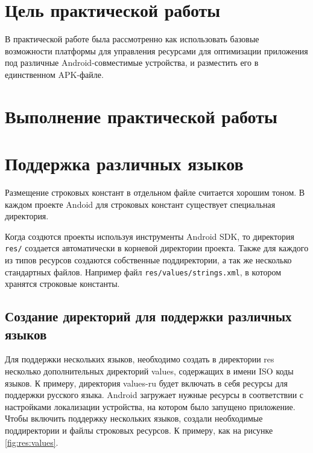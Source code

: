 \graphicspath{{./second/PNG}}
\section*{\LARGE{Цель практической работы}}
В практической работе была рассмотренно как использовать базовые возможности
платформы для управления ресурсами для оптимизации приложения
под различные Android-совместимые устройства, и разместить его в
единственном APK-файле.

\newpage

\section*{\LARGE{Выполнение практической работы}}

\section{Поддержка различных языков}
Размещение строковых констант в отдельном файле считается хорошим
тоном. В каждом проекте Andoid для строковых констант существует
специальная директория.\par
Когда создются проекты используя инструменты Android SDK, то
директория \texttt{res/} создается автоматически в корневой директории
проекта. Также для каждого из типов ресурсов создаются собственные
поддиректории, а так же несколько стандартных файлов. Например
файл \texttt{res/values/strings.xml}, в котором хранятся строковые константы.

\subsection{Создание директорий для поддержки различных языков}
Для поддержки нескольких языков, необходимо создать в директории res
несколько дополнительных директорий values, содержащих в имени ISO
коды языков. К примеру, директория values-ru будет включать в себя ресурсы
для поддержки русского языка.
Android загружает нужные ресурсы в соответствии с настройками
локализации устройства, на котором было запущено приложение.
Чтобы включить поддержку нескольких языков, создали
необходимые поддиректории и файлы строковых ресурсов. К примеру, как
на рисунке \ref{fig:res:values}.

